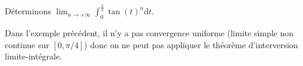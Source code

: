 \documentclass[french,11pt,twoside]{VcCours}
\newcommand{\dx}{\text{d}x}
\newcommand{\dt}{\text{d}t}
\begin{document}
\begin{Exemple} Déterminons $\lim_{n \rightarrow + \infty} \int_{0}^{\frac{\pi}{4}} \tan(t)^n \dt$.

%
\end{Exemple}

\newpage

\vspace*{4cm}

\begin{Remarque}{} Dans l'exemple précédent, il n'y a pas convergence uniforme (limite simple non continue sur $[0, \pi/4]$) donc on ne peut pas appliquer le théorème d'interversion limite-intégrale.
\end{Remarque}

%
\end{document}
